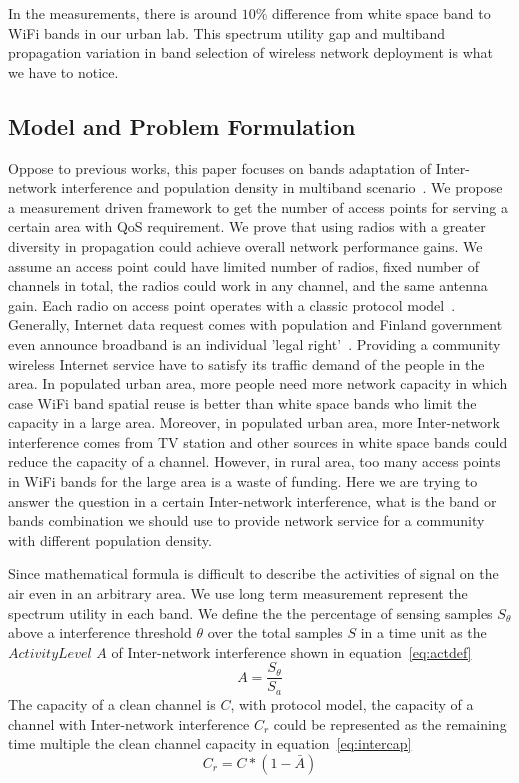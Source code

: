 In the measurements, there is around $10\%$ difference from white space 
band to WiFi bands in our urban lab. This spectrum utility gap and multiband
propagation variation in band selection of wireless network 
deployment is what we have to notice. 


\subsection{Model and Problem Formulation}
\label{subsec:problem}

Oppose to previous works, this paper focuses on bands adaptation of Inter-network 
interference and population density in multiband scenario~\cite{tang2005interference,yuan2006cross
,si2010overview}. We propose a measurement driven framework to get the  
number of access points for serving a certain area with QoS requirement.
We prove that using radios with a greater diversity in propagation could 
achieve overall network performance gains. 
We assume an access point could have limited number of radios, fixed number of 
channels in total, the radios could work in any channel, and the same antenna gain.
Each radio on access point operates with a classic protocol model~\cite{gupta2000capacity}. 
Generally, Internet data request comes with population and Finland government even announce 
broadband is an individual 'legal right'~\cite{bbcfinland,rosston2011household}. 
Providing a community wireless Internet service have to satisfy its traffic demand 
of the people in the area. In populated urban area, more people need more 
network capacity in which case WiFi band spatial reuse is better than white space bands
who limit the capacity in a large area. Moreover, in populated urban area, 
more Inter-network interference comes from TV station and other sources in white space
bands could reduce the capacity of a channel. However, in rural area, too many access points
in WiFi bands for the large area is a waste of funding. Here we are trying to answer the question
 in a certain Inter-network interference, what is the band or bands combination we should 
 use to provide network service for a community with different population density.

Since mathematical formula is difficult to describe the activities of 
signal on the air even in an arbitrary area.
We use long term measurement represent the spectrum utility in each band. 
We define the the percentage of sensing samples $S_\theta$ above a 
interference threshold $\theta$ over the total samples $S$ in a time unit as the 
{\it $Activity Level$} $A$ of Inter-network interference shown in equation~\ref{eq:actdef}
\begin{equation}
\label{eq:actdef}
A=\frac{S_\theta}{S_a}
\end{equation}
The capacity of a clean channel is $C$, with protocol model, the capacity 
of a channel with Inter-network interference $C_r$ could be represented as 
the remaining time multiple the clean channel capacity in equation~\ref{eq:intercap}
\begin{equation}
\label{eq:intercap}
C_r=C*(1-\bar{A})
\end{equation}

